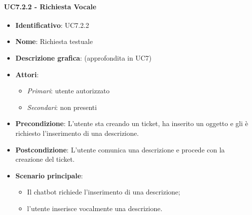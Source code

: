   \paragraph{UC7.2.2 - Richiesta Vocale}
  \begin{itemize}
     \item \textbf{Identificativo}: UC7.2.2
     \item \textbf{Nome}: Richiesta testuale
     \item \textbf{Descrizione grafica}: (approfondita in UC7)
     \item \textbf{Attori}:
     \begin{itemize} 
         \item \textit{Primari}: utente autorizzato
         \item \textit{Secondari}: non presenti
     \end{itemize}
         \item \textbf{Precondizione}: L'utente sta creando un ticket, ha inserito un oggetto e gli è richiesto l'inserimento di una descrizione.
         \item \textbf{Postcondizione}: L'utente comunica una descrizione e procede con la creazione del ticket. 
      \item \textbf{Scenario principale}: 
         \begin{itemize}  
          \item Il chatbot richiede l'inserimento di una descrizione;
          \item l'utente inserisce vocalmente una descrizione.
         \end{itemize}
  \end{itemize}


